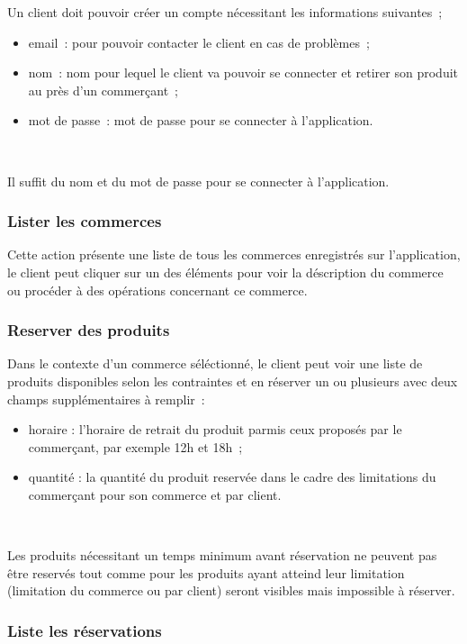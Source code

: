\documentclass[a4paper,12pt]{article}
\begin{document}
Un client doit pouvoir créer un compte nécessitant les informations suivantes~;
\begin{itemize}
	\item email~: pour pouvoir contacter le client en cas de problèmes~;
	\item nom~: nom pour lequel le client va pouvoir se connecter et retirer son produit au près d'un commerçant~;
	\item mot de passe~: mot de passe pour se connecter à l'application.
\end{itemize} \

Il suffit du nom et du mot de passe pour se connecter à l'application.

\subsubsection{Lister les commerces}

Cette action présente une liste de tous les commerces enregistrés sur l'application, le client peut cliquer sur un des éléments pour voir la déscription du commerce ou procéder à des opérations concernant ce commerce.

\subsubsection{Reserver des produits}

Dans le contexte d'un commerce séléctionné, le client peut voir une liste de produits disponibles selon les contraintes et en réserver un ou plusieurs avec deux champs supplémentaires à remplir~:

\begin{itemize}
	\item horaire : l'horaire de retrait du produit parmis ceux proposés par le commerçant, par exemple 12h et 18h~;
	\item quantité : la quantité du produit reservée dans le cadre des limitations du commerçant pour son commerce et par client.
\end{itemize} \

Les produits nécessitant un temps minimum avant réservation ne peuvent pas être reservés tout comme pour les produits ayant atteind leur limitation (limitation du commerce ou par client) seront visibles mais impossible à réserver.

\subsubsection{Liste les réservations}
\end{document}
